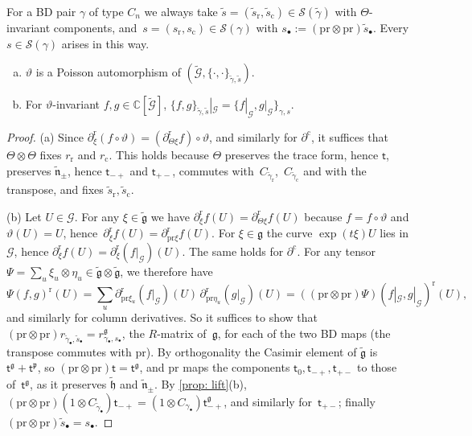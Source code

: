 \documentclass[a4paper]{amsart}
\numberwithin{equation}{section}
\theoremstyle{definition}
\theoremstyle{remark}
\newcommand{\bbC}{\mathbb{C}}
\newcommand{\mfh}{\mathfrak{h}}
\newcommand{\mfg}{\mathfrak{g}}
\newcommand{\mfn}{\mathfrak{n}}
\newcommand{\mfp}{\mathfrak{p}}
\newcommand{\mcG}{\mathcal{G}}
\newcommand{\mcS}{\mathcal{S}}
\newcommand{\tG}{\widetilde{\mcG}}
\newcommand{\tg}{\widetilde{\gamma}}
\newcommand{\vt}{\vartheta}
\newcommand{\Vt}{\Theta}
\newcommand{\rr}{\mathrm{r}}
\newcommand{\cc}{\mathrm{c}}
\newcommand{\pr}{\mathrm{pr}}
\newcommand{\Cas}{\mathsf t}
\begin{document}
For a BD pair $\gamma$ of type $C_n$ we always take $\widetilde{s}=(\widetilde{s}_{\rr},\widetilde{s}_{\cc})\in\mcS(\tg)$ with $\Vt$-invariant components, and~$s=(s_{\rr},s_{\cc})\in\mcS(\gamma)$ with $s_\bullet:=(\pr\otimes\pr)\widetilde{s}_\bullet$.
Every $s\in\mcS(\gamma)$ arises in this way.

\begin{proposition}
  \label{prop: restriction}
  \begin{enumerate}[(a)]
    \item $\vt$ is a Poisson automorphism of $(\tG,\{\cdot,\cdot\}_{\tg,\widetilde{s}})$.
    \item For $\vt$-invariant $f,g\in\bbC[\tG]$, $\{f,g\}_{\tg,\widetilde{s}}|_\mcG=\{f|_\mcG,g|_\mcG\}_{\gamma,s}$.
  \end{enumerate}
\end{proposition}
\begin{proof}
  (a) Since $\partial^\rr_\xi(f\circ\vt)=(\partial^\rr_{\Vt\xi}f)\circ\vt$, and similarly for $\partial^\cc$, it suffices that $\Vt\otimes\Vt$ fixes $r_\rr$ and $r_\cc$.
  This holds because $\Vt$ preserves the trace form, hence $\Cas$, preserves $\widetilde{\mfn}_\pm$, hence $\Cas_{-+}$ and $\Cas_{+-}$, commutes with~$C_{\tg_{\rr}}$,~$C_{\tg_{\cc}}$ and with the transpose, and fixes $\widetilde{s}_{\rr},\widetilde{s}_{\cc}$.

  (b) Let $U\in\mcG$.
  For any $\xi\in\widetilde{\mfg}$ we have $\partial^\rr_\xi f(U)=\partial^\rr_{\Vt\xi}f(U)$ because $f=f\circ\vt$ and $\vt(U)=U$, hence~$\partial^\rr_\xi f(U)=\partial^\rr_{\pr\xi}f(U)$.
  For $\xi\in\mfg$ the curve $\exp(t\xi)U$ lies in $\mcG$, hence $\partial^\rr_\xi f(U)=\partial^\rr_\xi(f|_\mcG)(U)$.
  The same holds for $\partial^\cc$.
  For any tensor $\Psi=\sum_u\xi_u\otimes\eta_u\in\widetilde{\mfg}\otimes\widetilde{\mfg}$, we therefore have
  \[
    \Psi(f,g)^\rr(U)=\sum_u\partial^\rr_{\pr\xi_u}(f|_\mcG)(U)\,\partial^\rr_{\pr\eta_u}(g|_\mcG)(U)=((\pr\otimes\pr)\Psi)(f|_\mcG,g|_\mcG)^\rr(U),
  \]
  and similarly for column derivatives.
  So it suffices to show that ${(\pr\otimes\pr)r_{\tg_\bullet,\widetilde{s}_\bullet}=r^\mfg_{\gamma_\bullet,s_\bullet}}$, the $R$-matrix of~$\mfg$, for each of the two BD maps (the transpose commutes with $\pr$).
  By orthogonality the Casimir element of $\widetilde{\mfg}$ is $\Cas^\mfg+\Cas^\mfp$, so $(\pr\otimes\pr)\Cas=\Cas^\mfg$, and $\pr$ maps the components $\Cas_0,\Cas_{-+},\Cas_{+-}$ to those of~$\Cas^\mfg$, as it preserves $\widetilde{\mfh}$ and $\widetilde{\mfn}_\pm$.
  By \cref{prop: lift}(b), $(\pr\otimes\pr)(1\otimes C_{\tg_\bullet})\Cas_{-+}=(1\otimes C_{\gamma_\bullet})\Cas^\mfg_{-+}$, and similarly for~$\Cas_{+-}$; finally $(\pr\otimes\pr)\widetilde{s}_\bullet=s_\bullet$.
\end{proof}
\end{document}
